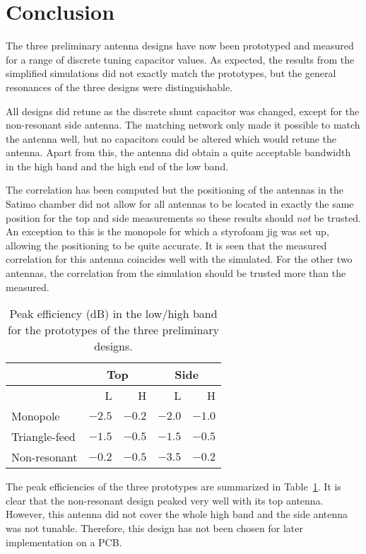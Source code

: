 \section{Conclusion}
The three preliminary antenna designs have now been prototyped and measured for a range of discrete tuning capacitor values. As expected, the results from the simplified simulations did not exactly match the prototypes, but the general resonances of the three designs were distinguishable.

All designs did retune as the discrete shunt capacitor was changed, except for the non-resonant side antenna. The matching network only made it possible to match the antenna well, but no capacitors could be altered which would retune the antenna. Apart from this, the antenna did obtain a quite acceptable bandwidth in the high band and the high end of the low band.

The correlation has been computed but the positioning of the antennas in the Satimo chamber did not allow for all antennas to be located in exactly the same position for the top and side measurements so these results should \emph{not} be trusted. An exception to this is the monopole for which a styrofoam jig was set up, allowing the positioning to be quite accurate. It is seen that the measured correlation for this antenna coincides well with the simulated. For the other two antennas, the correlation from the simulation should be trusted more than the measured.

\begin{table}[htbp]
    \centering
    \begin{tabular}{|l|r|r|r|r|}
        \hline
        & \multicolumn{2}{c|}{Top} & \multicolumn{2}{c|}{Side} \\
        \hline
        & L & H & L & H \\
        \hline
        Monopole & $-2.5$ & $-0.2$ & $-2.0$ & $-1.0$ \\
        Triangle-feed & $-1.5$ & $-0.5$ & $-1.5$ & $-0.5$ \\
        Non-resonant & $-0.2$ & $-0.5$ & $-3.5$ & $-0.2$ \\
        \hline
    \end{tabular}
    \caption{Peak efficiency (dB) in the low/high band for the prototypes of the three preliminary designs.}
    \label{tab:peakefficiencyproto}
\end{table}

The peak efficiencies of the three prototypes are summarized in Table~\ref{tab:peakefficiencyproto}. It is clear that the non-resonant design peaked very well with its top antenna. However, this antenna did not cover the whole high band and the side antenna was not tunable. Therefore, this design has not been chosen for later implementation on a PCB.

